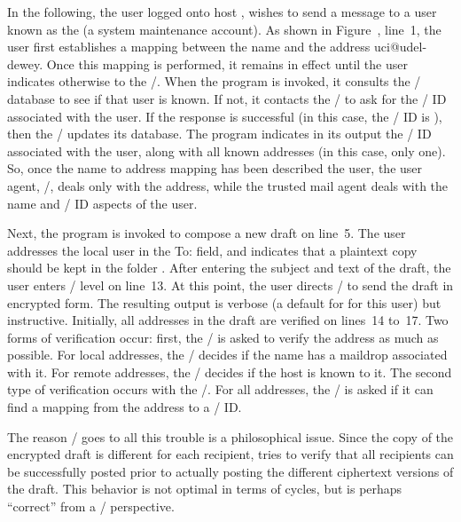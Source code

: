 

In the following,
the user  logged onto host ,
wishes to send a message to a user known as
the  (a system maintenance account).
As shown in Figure~\sendmail, line~1,
the user first establishes a mapping between the name  and
the address {\tx uci@udel-dewey}.
Once this mapping is performed,
it remains in effect until the user indicates otherwise to the \TMA/.
When the  program is invoked,
it consults the \TMA/ database to see if that user is known.
If not,
it contacts the \KDS/ to ask for the \KDS/ ID associated with the user.
If the response is successful (in this case, the \KDS/ ID is ),
then the \TMA/ updates its database.
The  program indicates in its output the \KDS/ ID associated with
the user,
along with all known addresses (in this case, only one).
So, once the name to address mapping has been described the user,
the user agent, \MH/, deals only with the address,
while the trusted mail agent deals with the name and \KDS/ ID aspects of the
user.

Next, the  program is invoked to compose a new draft on line~5.
The user addresses the local user  in the To: field,
and indicates that a plaintext copy should be kept in the folder .
After entering the subject and text of the draft,
the user enters \whatnow/ level on line~13.
At this point,
the user directs \MH/ to send the draft in encrypted form.
The resulting output is verbose (a default for  for this user)
but instructive.
Initially,
all addresses in the draft are verified on lines~14 to~17.
Two forms of verification occur:
first, the \MTS/ is asked to verify the address as much as possible.
For local addresses,
the \MTS/ decides if the name has a maildrop associated with it.
For remote addresses,
the \MTS/ decides if the host is known to it.
The second type of verification occurs with the \TMA/.
For all addresses,
the \TMA/ is asked if it can find a mapping from the address to a \KDS/ ID.

The reason \MH/ goes to all this trouble is a philosophical issue.
Since the copy of the encrypted draft is different for each recipient,
 tries to verify that all recipients can be successfully posted
prior to actually posting the different ciphertext versions of the draft.
This behavior is not optimal in terms of cycles,
but is perhaps ``correct'' from a \UA/ perspective.

